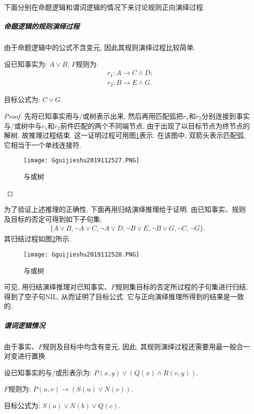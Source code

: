 下面分别在命题逻辑和谓词逻辑的情况下来讨论规则正向演绎过程.
\subparagraph{命题逻辑的规则演绎过程}
由于命题逻辑中的公式不含变元, 因此其规则演绎过程比较简单.
\begin{example}
设已知事实为: $A\vee B$, $F$规则为:
\begin{align}
    &r_1:  A\rightarrow C\wedge D;\\
    &r_2:  B\rightarrow E\wedge G.
\end{align}

目标公式为: $C\vee G$.
\end{example}
\begin{proof}
先将已知事实用与/或树表示出来, 然后再用匹配弧把$r_1$和$r_2$分别连接到事实与/或树中与$r_1$和$r_2$前件匹配的两个不同端节点, 由于出现了以目标节点为终节点的解树, 故推理过程结束. 这一证明过程可用图\ref{AI32fig2019120127}表示.
在该图中, 双箭头表示匹配弧, 它相当于一个单线连接符.
\begin{figure}[H]
\centering
\texttt{[image: Gguijieshu2019112527.PNG]}
\caption{与或树}
\label{AI32fig2019120127}
\end{figure}
\end{proof}
为了验证上述推理的正确性, 下面再用归结演绎推理给于证明. 由已知事实、规则及目标的否定可得到如下子句集:
\begin{align}
  \{A\vee B, \neg A\vee C, \neg A\vee D, \neg B\vee E, \neg B\vee G, \neg C, \neg G\}.
\end{align}
其归结过程如图\ref{AI32fig2019120128}所示.
\begin{figure}[H]
\centering
\texttt{[image: Gguijieshu2019112528.PNG]}
\caption{与或树}
\label{AI32fig2019120128}
\end{figure}
可见, 用归结演绎推理对已知事实、$F$规则集目标的否定所过程的子句集进行归结, 得到了空子句NIL, 从而证明了目标公式. 它与正向演绎推理所得到的结果是一致的.
\subparagraph{谓词逻辑情况}
由于事实、$F$规则及目标中均含有变元, 因此, 其规则演绎过程还需要用最一般合一对变进行置换.
\begin{example}
设已知事实的与/或形表示为: $P(x, y)\vee (Q(x)\wedge R(v, y))$.

$F$规则为: $P(u, v)\rightarrow (S(u)\vee N(v))$.

目标公式为: $S(a)\vee N(b)\vee Q(c)$.
\end{example}

